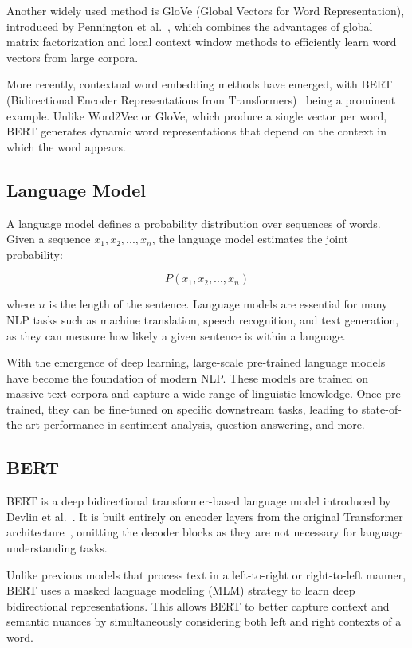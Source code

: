 \documentclass[11pt]{article}
\begin{document}
Another widely used method is GloVe (Global Vectors for Word Representation), introduced by Pennington et al.~\cite{pennington-etal-2014-glove}, which combines the advantages of global matrix factorization and local context window methods to efficiently learn word vectors from large corpora.

More recently, contextual word embedding methods have emerged, with BERT (Bidirectional Encoder Representations from Transformers)~\cite{vaswani2017attention} being a prominent example. Unlike Word2Vec or GloVe, which produce a single vector per word, BERT generates dynamic word representations that depend on the context in which the word appears.

\subsection{Language Model}

A language model defines a probability distribution over sequences of words. Given a sequence $x_1, x_2, ..., x_n$, the language model estimates the joint probability:

\[
P(x_1, x_2, ..., x_n)
\]

where $n$ is the length of the sentence. Language models are essential for many NLP tasks such as machine translation, speech recognition, and text generation, as they can measure how likely a given sentence is within a language.

With the emergence of deep learning, large-scale pre-trained language models have become the foundation of modern NLP. These models are trained on massive text corpora and capture a wide range of linguistic knowledge. Once pre-trained, they can be fine-tuned on specific downstream tasks, leading to state-of-the-art performance in sentiment analysis, question answering, and more.

\subsection{BERT}

BERT is a deep bidirectional transformer-based language model introduced by Devlin et al.~\cite{BERTJacob}. It is built entirely on encoder layers from the original Transformer architecture~\cite{vaswani2017attention}, omitting the decoder blocks as they are not necessary for language understanding tasks.

Unlike previous models that process text in a left-to-right or right-to-left manner, BERT uses a masked language modeling (MLM) strategy to learn deep bidirectional representations. This allows BERT to better capture context and semantic nuances by simultaneously considering both left and right contexts of a word.
\end{document}
